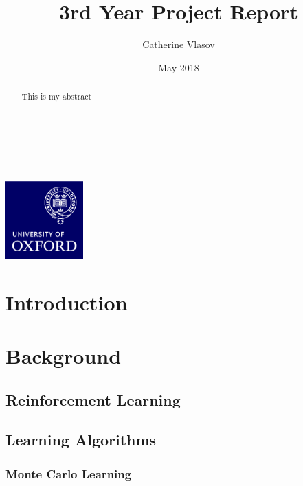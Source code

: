 \documentclass[11pt,a4paper]{report}
\author{Catherine Vlasov}
\title{3rd Year Project Report}
\date{May 2018}
\begin{document}
\makeatletter
	\begin{titlepage}
		\vspace*{\fill}
		\begin{center}
			{\huge \bfseries \@title }
			\\[4ex]
			{\LARGE  \@author}
			\\[2ex]
			{\large \@date}
			\\[50ex]
			\includegraphics[width=30mm]{oxlogo.png}
		\end{center}
		\vspace*{\fill}
	\end{titlepage}
\makeatother

\begin{abstract}
This is my abstract
\end{abstract}

\tableofcontents


\chapter{Introduction}


\chapter{Background}


\section{Reinforcement Learning}


\section{Learning Algorithms}


\subsection{Monte Carlo Learning}

\label{sec:monteCarloPseudocode}




\end{document}
